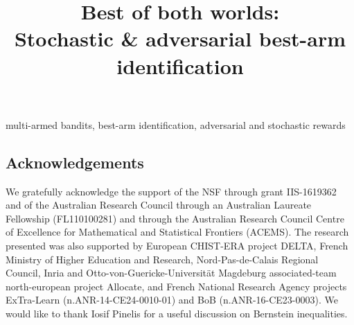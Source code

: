 \documentclass[final,12pt]{colt2018} %
\title[Best of both worlds: Stochastic \& adversarial
 best-arm identification]{\textcolor{pearOne}{Best of both worlds:} \\ \textcolor{pearDark}{Stochastic} 
 	\textcolor{pearOne}{\&} \textcolor{pearThree}{adversarial} 
 	 best-arm identification}
\begin{document}
\maketitle



\begin{keywords}
multi-armed bandits, best-arm identification, adversarial and stochastic rewards
\end{keywords}












%


\subsection*{Acknowledgements}
We gratefully acknowledge the support of the NSF through grant IIS-1619362 and of the Australian Research Council through an Australian Laureate Fellowship (FL110100281) and through the Australian Research Council Centre of Excellence for Mathematical and Statistical Frontiers (ACEMS).
The research presented was also supported by European CHIST-ERA project DELTA, French Ministry of
Higher Education and Research, Nord-Pas-de-Calais Regional Council,
Inria and Otto-von-Guericke-Universit\"at Magdeburg associated-team north-european project Allocate, and French National Research Agency projects ExTra-Learn (n.ANR-14-CE24-0010-01) and BoB (n.ANR-16-CE23-0003).
We would like to thank Iosif Pinelis for a useful discussion on Bernstein inequalities.





\newpage
\appendix
	
\end{document}
